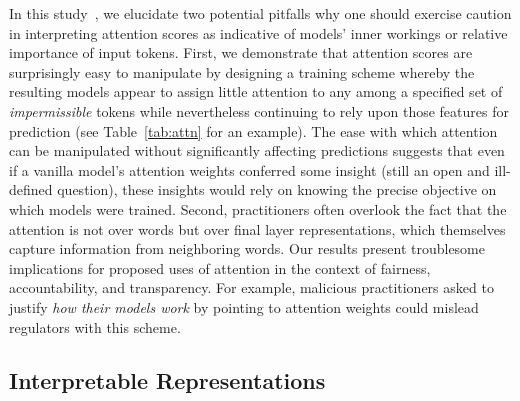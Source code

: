 \documentclass{article}
\begin{document}
In this study~\cite{pruthi19learning}, 
we elucidate two 
potential pitfalls  
why 
one should exercise caution in 
interpreting attention scores
as indicative of models' inner workings
or relative importance of input tokens.
First, 
we demonstrate  
that attention scores are surprisingly easy to manipulate 
by designing a training scheme 
whereby the resulting models appear to assign little attention 
to any among a specified set of \emph{impermissible} tokens
while nevertheless continuing to rely upon those features for prediction (see Table~\ref{tab:attn} for an example).
The ease with which attention can be manipulated
without significantly affecting predictions 
suggests that even if a vanilla model's attention weights 
conferred some insight (still an open and ill-defined question),
these insights would rely on knowing 
the precise objective 
on which models were trained.   
Second, 
practitioners often overlook the fact that
the attention is not over words 
but over final layer representations, 
which themselves capture 
information from neighboring words.
Our results present troublesome implications 
for proposed uses of attention in the context
of fairness, accountability, and transparency.
For example, malicious practitioners asked to justify 
\emph{how their models work} by pointing to attention weights
could 
mislead regulators with this scheme.

\subsection{Interpretable Representations}
\label{spine}
\end{document}
